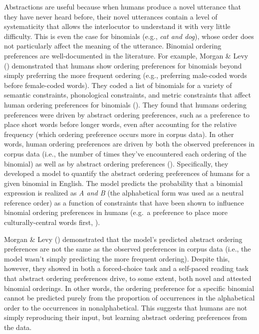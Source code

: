 \documentclass[
  nottoc]{article}
\begin{document}
Abstractions are useful because when humans produce a novel utterance
that they have never heard before, their novel utterances contain a
level of systematicity that allows the interlocutor to understand it
with very little difficulty. This is even the case for binomials (e.g.,
\emph{cat and dog}), whose order does not particularly affect the
meaning of the utterance. Binomial ordering preferences are
well-documented in the literature. For example, Morgan \& Levy
() demonstrated
that humans show ordering preferences for binomials beyond simply
preferring the more frequent ordering (e.g., preferring male-coded words
before female-coded words). They coded a list of binomials for a variety
of semantic constraints, phonological constraints, and metric
constraints that affect human ordering preferences for binomials
().
They found that humans ordering preferences were driven by abstract
ordering preferences, such as a preference to place short words before
longer words, even after accounting for the relative frequency (which
ordering preference occurs more in corpus data). In other words, human
ordering preferences are driven by both the observed preferences in
corpus data (i.e., the number of times they've encountered each ordering
of the binomial) as well as by abstract ordering preferences
(). Specifically, they developed a model to quantify the abstract
ordering preferences of humans for a given binomial in English. The
model predicts the probability that a binomial expression is realized as
\emph{A and B} (the alphabetical form was used as a neutral reference
order) as a function of constraints that have been shown to influence
binomial ordering preferences in humans (e.g.~a preference to place more
culturally-central words first,
).

Morgan \& Levy ()
demonstrated that the model's predicted abstract ordering preferences
are not the same as the observed preferences in corpus data (i.e., the
model wasn't simply predicting the more frequent ordering). Despite
this, however, they showed in both a forced-choice task and a self-paced
reading task that abstract ordering preferences drive, to some extent,
both novel and attested binomial orderings. In other words, the ordering
preference for a specific binomial cannot be predicted purely from the
proportion of occurrences in the alphabetical order to the occurrences
in nonalphabetical. This suggests that humans are not simply reproducing
their input, but learning abstract ordering preferences from the data.
\end{document}

